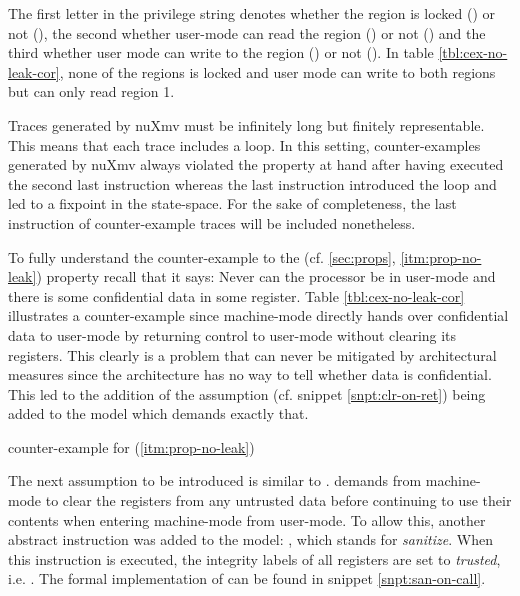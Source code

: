 The first letter in the privilege string denotes whether the region is locked () or not (\minrv{-}), the second whether user-mode can read the region () or not (\minrv{-}) and the third whether user mode can write to the region () or not (\minrv{-}).
In table \ref{tbl:cex-no-leak-cor}, none of the regions is locked and user mode can write to both regions but can only read region 1.

Traces generated by nuXmv must be infinitely long but finitely representable.
This means that each trace includes a loop.
In this setting, counter-examples generated by nuXmv always violated the property at hand after having executed the second last instruction whereas the last instruction introduced the loop and led to a fixpoint in the state-space.
For the sake of completeness, the last instruction of counter-example traces will be included nonetheless.

To fully understand the counter-example to the  (cf. \ref{sec:props}, \ref{itm:prop-no-leak}) property recall that it says: Never can the processor be in user-mode and there is some confidential data in some register.
Table \ref{tbl:cex-no-leak-cor} illustrates a counter-example since machine-mode directly hands over confidential data to user-mode by returning control to user-mode without clearing its registers.
This clearly is a problem that can never be mitigated by architectural measures since the architecture has no way to tell whether data is confidential.
This led to the addition of the assumption  (cf. snippet \ref{snpt:clr-on-ret}) being added to the model which demands exactly that.

\begin{table}
    \centering
    
    \caption{ counter-example for  (\ref{itm:prop-no-leak})}
    \label{tbl:cex-no-leak-cor}
\end{table}

The next assumption to be introduced is similar to .
 demands from machine-mode to clear the registers from any untrusted data before continuing to use their contents when entering machine-mode from user-mode.
To allow this, another abstract instruction was added to the model: , which stands for \textit{sanitize}.
When this instruction is executed, the integrity labels of all registers are set to \textit{trusted}, i.e. .
The formal implementation of  can be found in snippet \ref{snpt:san-on-call}.

